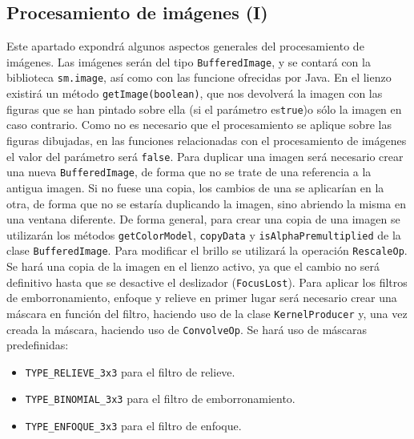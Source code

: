 \subsection{Procesamiento de imágenes (I)}
Este apartado expondrá algunos aspectos generales del procesamiento de imágenes.
\vskip0.3cm
Las imágenes serán del tipo \texttt{BufferedImage}, y se contará con la biblioteca \texttt{sm.image}, así como con las funcione ofrecidas por Java. En el lienzo existirá un método \texttt{getImage(boolean)}, que nos devolverá la imagen con las figuras que se han pintado sobre ella (si el parámetro es\texttt{true})o sólo la imagen en caso contrario. Como no es necesario que el procesamiento se aplique sobre las figuras dibujadas, en las funciones relacionadas con el procesamiento de imágenes el valor del parámetro será \texttt{false}.
\vskip0.3cm
Para duplicar una imagen será necesario crear una nueva \texttt{BufferedImage}, de forma que no se trate de una referencia a la antigua imagen. Si no fuese una copia, los cambios de una se aplicarían en la otra, de forma que no se estaría duplicando la imagen, sino abriendo la misma en una ventana diferente.
De forma general, para crear una copia de una imagen se utilizarán los métodos \texttt{getColorModel}, \texttt{copyData} y \texttt{isAlphaPremultiplied} de la clase \texttt{BufferedImage}.
\vskip0.3cm
Para modificar el brillo se utilizará la operación \texttt{RescaleOp}. Se hará una copia de la imagen en el lienzo activo, ya que el cambio no será definitivo hasta que se desactive el deslizador (\texttt{FocusLost}).
\vskip0.3cm
Para aplicar los filtros de emborronamiento, enfoque y relieve en primer lugar será necesario crear una máscara en función del filtro, haciendo uso de la clase \texttt{KernelProducer} y, una vez creada la máscara, haciendo uso de \texttt{ConvolveOp}. Se hará uso de máscaras predefinidas:
\begin{itemize}
\item{\texttt{TYPE\_RELIEVE\_3x3} para el filtro de relieve.}
\item{\texttt{TYPE\_BINOMIAL\_3x3} para el filtro de emborronamiento.}
\item{\texttt{TYPE\_ENFOQUE\_3x3} para el filtro de enfoque.}
\end{itemize}
